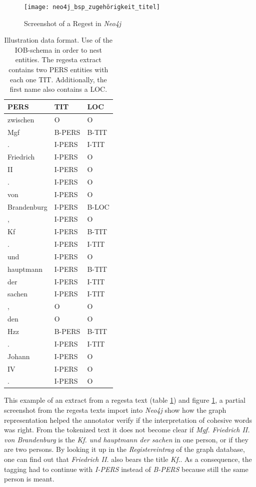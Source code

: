 \documentclass[11pt,a4paper]{article}
\begin{document}
\begin{figure}[h]
	\texttt{[image: neo4j\_bsp\_zugehörigkeit\_titel]}
	\centering
	\caption{Screenshot of a Regest in \textit{Neo4j}}
	\label{fig:RegestScreenshot}
\end{figure}

\begin{table}
	\centering
	\begin{tabular}{ l  l  l }
		\textbf{PERS} & \textbf{TIT} & \textbf{LOC} \\ \hline
		zwischen & O & O \\ \hline
		Mgf & B-PERS & B-TIT \\ \hline
		. & I-PERS & I-TIT \\ \hline
		Friedrich & I-PERS & O \\ \hline
		II & I-PERS & O \\ \hline
		. & I-PERS & O \\ \hline
		von & I-PERS & O \\ \hline
		Brandenburg & I-PERS & B-LOC \\ \hline
		, & I-PERS & O \\ \hline
		Kf & I-PERS & B-TIT \\ \hline
		. & I-PERS & I-TIT \\ \hline
		und & I-PERS & O \\ \hline
		hauptmann & I-PERS & B-TIT \\ \hline
		der & I-PERS & I-TIT \\ \hline
		sachen & I-PERS & I-TIT \\ \hline
		, & O & O  \\ \hline
		den & O & O  \\ \hline
		Hzz & B-PERS & B-TIT \\ \hline
		. & I-PERS & I-TIT \\ \hline
		Johann & I-PERS & O \\ \hline	
		IV & I-PERS & O \\ \hline
		. & I-PERS & O \\ \hline
	\end{tabular}
	\caption{Illustration data format. Use of the IOB-schema in order to nest entities. The regesta extract contains two PERS entities with each one TIT. Additionally, the first name also contains a LOC.}
	\label{tab:illuDataDormatIOB}
\end{table}

This example of an extract from a regesta text (table \ref{tab:illuDataDormatIOB}) and figure \ref{fig:RegestScreenshot}, a partial screenshot from the regesta texts import into \textit{Neo4j} show how the graph representation helped the annotator verify if the interpretation of cohesive words was right. From the tokenized text it does not become clear if \textit{Mgf. Friedrich II. von Brandenburg} is the \textit{Kf. und hauptmann der sachen} in one person, or if they are two persons. By looking it up in the \textit{Registereintrag} of the graph database, one can find out that \textit{Friedrich II.} also bears the title \textit{Kf.}. As a consequence, the tagging had to continue with \textit{I-PERS} instead of \textit{B-PERS} because still the same person is meant.
\end{document}
